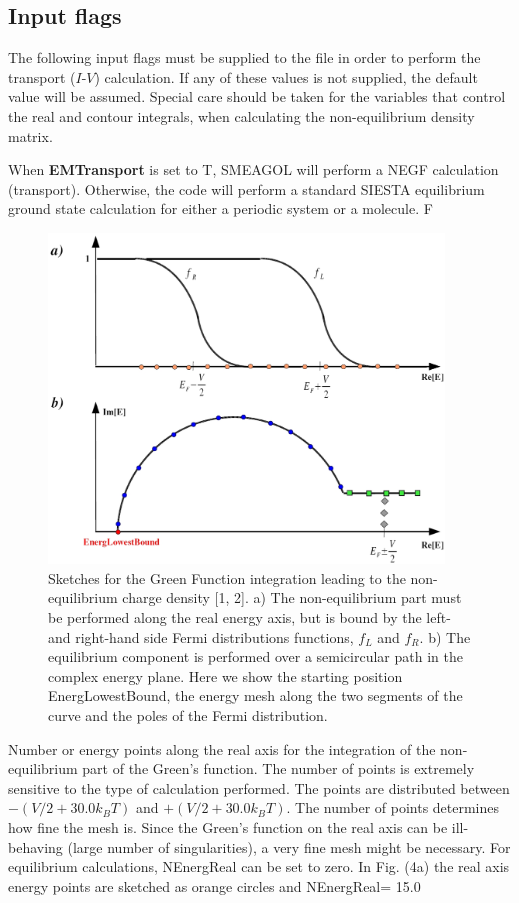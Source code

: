\documentclass[11pt]{article}
\begin{document}
\subsection{Input flags}
The following input flags must be supplied to the file  in order to perform the transport ($I$-$V$) calculation. If any of these values is not supplied, the default value will be assumed.  Special care should be taken for the variables that control the real and contour integrals, when calculating the non-equilibrium density matrix.

\vspace{0.5cm}
{When {\bf EMTransport} is set to T, SMEAGOL will perform a NEGF calculation (transport).  Otherwise, the code will perform a standard SIESTA equilibrium ground state calculation for either a periodic system or a molecule.}
{F}

\begin{figure}[h]
\center
\includegraphics[width=10.5cm,clip=true]{fig/Fig4}
\caption{ Sketches for the Green Function integration leading to the non-equilibrium charge density
[1, 2]. a) The non-equilibrium part must be performed along the real energy axis, but is bound by the
left- and right-hand side Fermi distributions functions, $f_L$ and $f_R$. b) The equilibrium component is
performed over a semicircular path in the complex energy plane. Here we show the starting position
EnergLowestBound, the energy mesh along the two segments of the curve and the poles of the Fermi
distribution.  }
\label{fig:integral}
\end{figure}
{Number or energy points along the real axis for the integration of the non-equilibrium part of the Green's function. The number of points is extremely sensitive to the type of calculation performed. The points are distributed between $-(V/2 + 30.0 k_B T)$ and $+(V/2 + 30.0 k_B T)$. The number of points determines how fine the mesh is. Since the Green's function on the real axis can be ill-behaving (large number of singularities), a very fine mesh might be necessary. For equilibrium calculations, NEnergReal can be set to zero. In Fig. (4a) the real axis energy points are sketched as orange circles and NEnergReal= 15.}{0}
\end{document}
